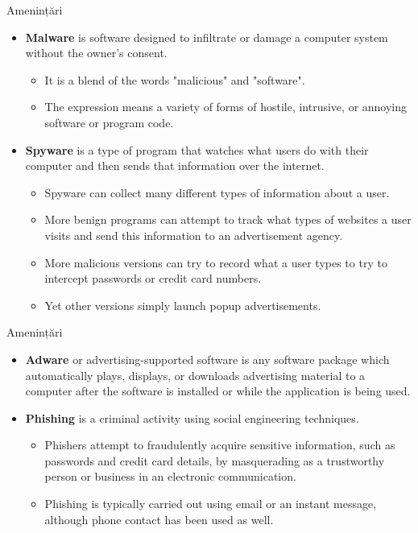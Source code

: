 \documentclass[pdf]{beamer}
\begin{document}
\begin{frame}{Amenințări}
\begin{itemize}
\item
\textbf{Malware} is software designed to infiltrate or damage a computer system without the owner's  consent. 
\begin{itemize}
\item
It is a blend of the words "malicious" and "software". 
\item
The expression means a variety of forms of hostile, intrusive, or annoying software or program code.
\end{itemize}

\item
\textbf{Spyware} is a type of program that watches what users do with their computer and then sends that information over the internet. 
\begin{itemize}
\item
Spyware can collect many different types of information about a user.
\item 
More benign programs can attempt to track what types of websites a user visits and send this information to an advertisement agency.
\item
More malicious versions can try to record what a user types to try to intercept passwords or credit card numbers. 
\item
Yet other versions simply launch popup advertisements.
\end{itemize}

\end{itemize}
\end{frame}



\begin{frame}{Amenințări}
\begin{itemize}
\item
\textbf{Adware} or advertising-supported software is any software package which automatically plays, displays, or downloads advertising material to a computer after the software is installed or while the application is being used.

\item
\textbf{Phishing} is a criminal activity using social engineering techniques. 
\begin{itemize}
\item
Phishers attempt to fraudulently acquire sensitive information, such as passwords and credit card details, by masquerading as a trustworthy person or business in an electronic communication.
\item
Phishing is typically carried out using email or an instant message, although phone contact has been used as well. 
\end{itemize}

\end{itemize}
\end{frame}
\end{document}
